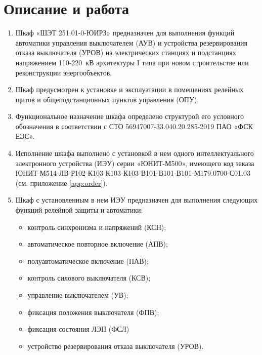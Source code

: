\color{unidarkgreen}\section[Описание и работа]{Описание и работа}\color{black}


\color{black}

\begin{enumerate}[label=\arabic{section}.\arabic{subsection}.\arabic*, align=left, labelsep=4pt, leftmargin=0pt, itemindent=2cm]

\item
Шкаф «ШЭТ 251.01-0-ЮИРЗ» предназначен для выполнения функций автоматики управления выключателем (АУВ) и устройства резервирования отказа выключателя (УРОВ) на электрических станциях и подстанциях напряжением 110-220~кВ архитектуры I типа при новом строительстве или реконструкции энергообъектов.

\item
Шкаф предусмотрен к установке и эксплуатации в помещениях релейных щитов и общеподстанционных пунктов управления (ОПУ).

\item
Функциональное назначение шкафа определено структурой его условного обозначения в соответствии с СТО 56947007-33.040.20.285-2019 ПАО «ФСК ЕЭС».

\item
Исполнение шкафа выполнено с установкой в нем одного интеллектуального электронного устройства (ИЭУ) серии «ЮНИТ-М500», имеющего код заказа ЮНИТ-М514-ЛВ-Р102-К103-К103-К103-В101-В101-В101-М179.0700-С01.03 (см. приложение \ref{app:order}).

\item
Шкаф с установленным в нем ИЭУ предназначен для выполнения следующих функций релейной защиты и автоматики:
\begin{itemize}
\item контроль синхронизма и напряжений (КСН);
\item автоматическое повторное включение (АПВ);
\item полуавтоматическое включение (ПАВ);
\item контроль силового выключателя (КСВ);
\item управление выключателем (УВ);
\item фиксация положения выключателя (ФПВ);
\item фиксация состояния ЛЭП (ФСЛ) 
\item устройство резервирования отказа выключателя (УРОВ).
\end{itemize}


\end{enumerate}
